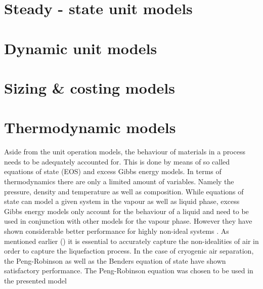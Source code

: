     \section{Steady - state unit models}
    \label{sec:mathpro:steady}
        

    \section{Dynamic unit models}
    \label{sec:mathpro:dynamic}
        

    \section{Sizing \& costing models}
    \label{sec:mathpro:econ}
        

    \section{Thermodynamic models}
        \label{sec:mathpro:thermo}

        Aside from the unit operation models, the behaviour of materials in a process needs to be adequately
        accounted for. This is done by means of so called equations of state (EOS) and excess Gibbs energy
        models. In terms of thermodynamics there are only a limited amount of variables. Namely the pressure,
        density and temperature as well as composition. While equations of state can model a given system in
        the vapour as well as liquid phase, excess Gibbs energy models only account for the behaviour of a liquid
        and need to be used in conjunction with other models for the vapour phase. However they have shown
        considerable better performance for highly non-ideal systems \cite{AndreasPfennig.2003}. As mentioned
        earlier () it is essential to accurately capture the non-idealities of air
        in order to capture the liquefaction process. In the case of cryogenic air separation, the Peng-Robinson
        as well as the Benders equation of state have shown satisfactory performance. The Peng-Robinson equation
        was chosen to be used in the presented model


